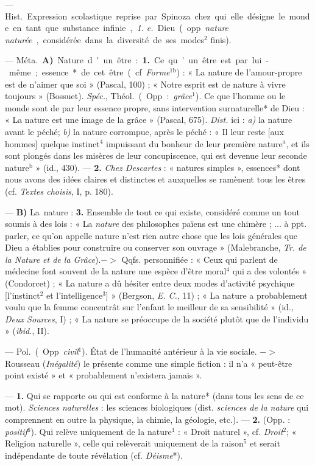 \begin{itemize}[leftmargin=1cm, label=, itemsep=1pt]
 — \si{Hist.} Expression scolastique reprise par
Spinoza chez qui elle désigne le monde en tant que substance infinie, {\it 1.
e.} Dieu (opp. {\it nature naturée}, considérée dans la diversité de ses
modes$^2$ finis).

 — \si{Méta.} {\bf A)} \si{Nature d'un être} : {\bf 1.} Ce qu'un
être est par lui-même ; essence* de cet être (cf. {\it Forme}$^\text{1b}$) :
« La nature de l’amour-propre est de n’aimer que soi » (Pascal, 100) ;
« Notre esprit est de nature à vivre toujours » (Bossuet). {\it Spéc.},
\si{Théol.} (Opp. : {\it grâce}$^1$). Ce que l’homme ou le monde sont de par
leur essence propre, sans intervention surnaturelle* de Dieu : « La nature
est une image de la grâce » (Pascal, 675). {\it Dist.} ici : {\it a)} la
nature avant le péché; {\it b)} la nature corrompue, après le péché : « Il
leur reste [aux hommes] quelque instinct$^4$ impuissant du bonheur de leur
première nature$^\text{a}$, et ils sont plongés dans les misères de leur
concupiscence, qui est devenue leur seconde nature$^\text{b}$ » (id., 430). —
{\bf 2.} {\it Chez Descartes} : « natures simples », essences* dont nous
avons des idées claires et distinctes et auxquelles se ramènent tous les
êtres (cf. {\it Textes choisis}, I, p. 180).

— {\bf B)} \si{La nature} : {\bf 3.} Ensemble de tout ce qui existe,
considéré comme un tout soumis à des lois : « La {\it nature} des philosophes
païens est une chimère ; ... à ppt. parler, ce qu’on appelle nature n’est
rien autre chose que les lois générales que Dieu a établies pour construire
ou conserver son ouvrage » (Malebranche, {\it Tr. de la Nature et de la
Grâce}).$->$ Qqfs. personnifiée : « Ceux qui parlent de médecine font souvent
de la nature une espèce d'être moral$^4$ qui a des volontés » (Condorcet) ;
« La nature a dû hésiter entre deux modes d'activité psychique [l’instinct$^2$
et l'intelligence$^3$] » (Bergson, {\it E. C.}, 11) ; « La nature a
probablement voulu que la femme concentrât sur l'enfant le meilleur de sa
sensibilité » (id., {\it Deux Sources}, I) ; « La nature se préoccupe de la
société plutôt que de l'individu » ({\it ibid.}, II).

 — \si{Pol.} (Opp. {\it civil}$^1$). État de l'humanité
antérieur à la vie sociale. $->$ Rousseau ({\it Inégalité}) le présente comme
une simple fiction : il n'a « peut-être point existé » et « probablement
n’existera jamais ».

 — {\bf 1.} Qui se rapporte ou qui est conforme à la nature*
(dans tous les sens de ce mot). {\it Sciences naturelles} : les sciences
biologiques (dist. {\it sciences de la nature} qui comprennent en outre la
physique, la chimie, la géologie, etc.). — {\bf 2.} (Opp. :
{\it positif}$^6$). Qui relève uniquement de la nature$^1$ : « Droit
naturel », cf. {\it Droit}$^2$; « Religion naturelle », celle qui relèverait
uniquement de la raison$^5$ et serait indépendante de toute révélation (cf.
{\it Déisme}*).


\end{itemize}
